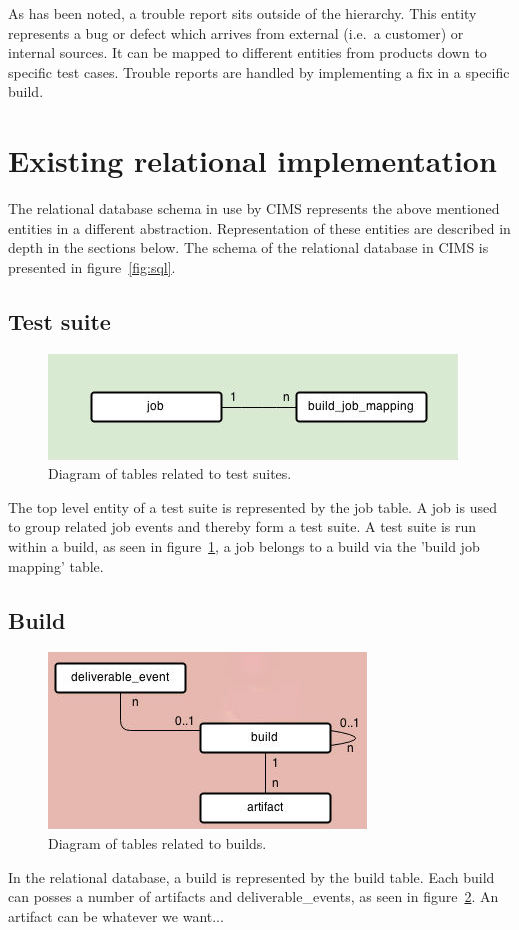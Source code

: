 As has been noted, a trouble report sits outside of the hierarchy. This entity represents a bug or defect which arrives from external (i.e.\ a customer) or internal sources. It can be mapped to different entities from products down to specific test cases. Trouble reports are handled by implementing a fix in a specific build.


\section{Existing relational implementation}
The relational database schema in use by CIMS represents the above mentioned entities in a different abstraction. Representation of these entities are described in depth in the sections below. 
The schema of the relational database in CIMS is presented in figure~\ref{fig:sql}.
\subsection{Test suite}
\begin{figure}[h!]
\centering
\includegraphics[scale=0.5]{figure/job.jpg}
\caption{Diagram of tables related to test suites.}
\label{fig:job}
\end{figure}
The top level entity of a test suite is represented by the job table. A job is used to group related job events and thereby form a test suite. A test suite is run within a build, as seen in figure~\ref{fig:job}, a job belongs to a build via the 'build job mapping' table. 
\subsection{Build}
\begin{figure}[h!]
\centering
\includegraphics[scale=0.5]{figure/build.jpg}
\caption{Diagram of tables related to builds.}
\label{fig:build}
\end{figure}
In the relational database, a build is represented by the build table. Each build can posses a number of artifacts and deliverable\_events, as seen in figure~\ref{fig:build}. An artifact can be whatever we want...
